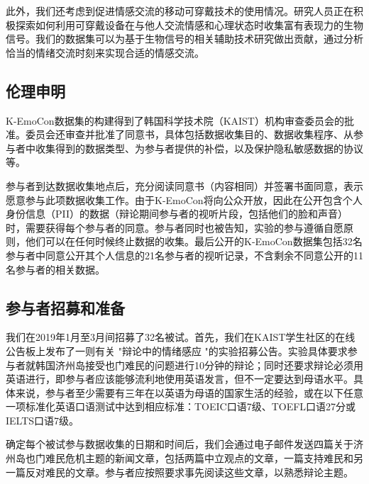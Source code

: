 此外，我们还考虑到促进情感交流的移动可穿戴技术的使用情况。研究人员正在积极探索如何利用可穿戴设备在与他人交流情感和心理状态时收集富有表现力的生物信号。我们的数据集可以为基于生物信号的相关辅助技术研究做出贡献，通过分析恰当的情绪交流时刻来实现合适的情感交流。
\subsection{伦理申明}
K-EmoCon数据集的构建得到了韩国科学技术院（KAIST）机构审查委员会的批准。委员会还审查并批准了同意书，具体包括数据收集目的、数据收集程序、从参与者中收集得到的数据类型、为参与者提供的补偿，以及保护隐私敏感数据的协议等。

参与者到达数据收集地点后，充分阅读同意书（内容相同）并签署书面同意，表示愿意参与此项数据收集工作。由于K-EmoCon将向公众开放，因此在公开包含个人身份信息（PII）的数据（辩论期间参与者的视听片段，包括他们的脸和声音）时，需要获得每个参与者的同意。参与者同时也被告知，实验的参与遵循自愿原则，他们可以在任何时候终止数据的收集。最后公开的K-EmoCon数据集包括32名参与者中同意公开其个人信息的21名参与者的视听记录，不含剩余不同意公开的11名参与者的相关数据。
\subsection{参与者招募和准备}
我们在2019年1月至3月间招募了32名被试。首先，我们在KAIST学生社区的在线公告板上发布了一则有关 "辩论中的情绪感应 "的实验招募公告。实验具体要求参与者就韩国济州岛接受也门难民的问题进行10分钟的辩论；同时还要求辩论必须用英语进行，即参与者应该能够流利地使用英语发言，但不一定要达到母语水平。具体来说，参与者至少需要有三年在以英语为母语的国家生活的经验，或在以下任意一项标准化英语口语测试中达到相应标准：TOEIC口语7级、TOEFL口语27分或IELTS口语7级。

确定每个被试参与数据收集的日期和时间后，我们会通过电子邮件发送四篇关于济州岛也门难民危机主题的新闻文章，包括两篇中立观点的文章，一篇支持难民和另一篇反对难民的文章。参与者应按照要求事先阅读这些文章，以熟悉辩论主题。

